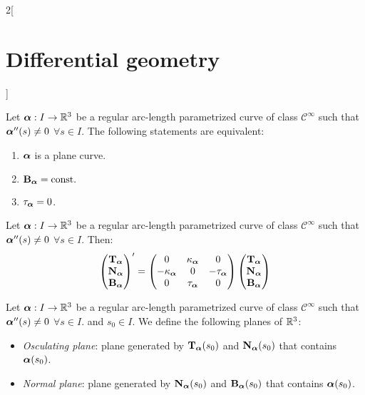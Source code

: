 \documentclass[../../../main.tex]{subfiles}
\begin{document}
\begin{multicols}{2}[\section{Differential geometry}]
\begin{proposition}
  \end{proposition}
  \begin{proposition}
    Let $\vf{\alpha}:I\rightarrow\RR^3$ be a regular arc-length parametrized curve of class $\mathcal{C}^\infty$ such that $\vf{\alpha}''(s)\ne 0$ $\forall s\in I$. The following statements are equivalent:
    \begin{enumerate}
      \item $\vf{\alpha}$ is a plane curve.
      \item $\B\alpha=\const$
      \item $\ta\alpha=0$.
    \end{enumerate}
  \end{proposition}
  \begin{theorem}
    Let $\vf{\alpha}:I\rightarrow\RR^3$ be a regular arc-length parametrized curve of class $\mathcal{C}^\infty$ such that $\vf{\alpha}''(s)\ne 0$ $\forall s\in I$. Then:
    $$
      \begin{pmatrix}
        \T\alpha \\
        \N\alpha \\
        \B\alpha \\
      \end{pmatrix}'=
      \begin{pmatrix}
        0          & \ka\alpha & 0          \\
        -\ka\alpha & 0         & -\ta\alpha \\
        0          & \ta\alpha & 0
      \end{pmatrix}
      \begin{pmatrix}
        \T\alpha \\
        \N\alpha \\
        \B\alpha \\
      \end{pmatrix}
    $$
  \end{theorem}
  \begin{definition}
    Let $\vf{\alpha}:I\rightarrow\RR^3$ be a regular arc-length parametrized curve of class $\mathcal{C}^\infty$ such that $\vf{\alpha}''(s)\ne 0$ $\forall s\in I$. and $s_0\in I$. We define the following planes of $\RR^3$:
    \begin{itemize}
      \item \emph{Osculating plane}: plane generated by $\T\alpha(s_0)$ and $\N\alpha(s_0)$ that contains $\vf{\alpha}(s_0)$.
      \item \emph{Normal plane}: plane generated by $\N\alpha(s_0)$ and $\B\alpha(s_0)$ that contains $\vf{\alpha}(s_0)$.

\end{itemize}
\end{definition}
\end{multicols}
\end{document}
